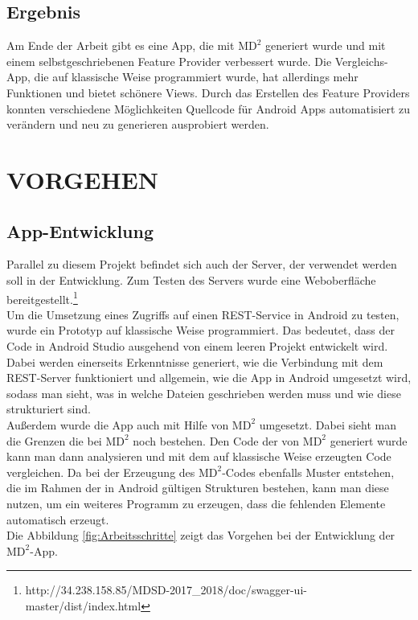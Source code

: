 \documentclass[a4paper,twoside]{article}
\begin{document}
	\subsection{Ergebnis}
	Am Ende der Arbeit gibt es eine App, die mit $\text{MD}^2$ generiert wurde und mit einem selbstgeschriebenen Feature Provider verbessert wurde. Die Vergleichs-App, die auf klassische Weise programmiert wurde, hat allerdings mehr Funktionen und bietet sch\"onere Views. Durch das Erstellen des Feature Providers konnten verschiedene M\"oglichkeiten Quellcode f\"ur Android Apps automatisiert zu ver\"andern und neu zu generieren ausprobiert werden.
	
	\section{\uppercase{Vorgehen}}
	
	\subsection{App-Entwicklung}
	
	\noindent Parallel zu diesem Projekt befindet sich auch der Server, der verwendet werden soll in der Entwicklung. Zum Testen des Servers wurde eine Web\-ober\-fl\"ache bereitgestellt.\footnote{http://34.238.158.85/MDSD-2017\_2018/doc/swagger-ui-master/dist/index.html} \\
	Um die Umsetzung eines Zugriffs auf einen REST-Service in Android zu testen, wurde ein Prototyp auf klassische Weise programmiert. Das bedeutet, dass der Code in Android Studio ausgehend von einem leeren Projekt entwickelt wird. Dabei werden einerseits Erkenntnisse generiert, wie die Verbindung mit dem REST-Server funktioniert und allgemein, wie die App in Android umgesetzt wird, sodass man sieht, was in welche Dateien geschrieben werden muss und wie diese strukturiert sind.\\
	Au\ss{}erdem wurde die App auch mit Hilfe von $\text{MD}^2$ umgesetzt. Dabei sieht man die Grenzen die bei $\text{MD}^2$ noch bestehen. Den Code der von $\text{MD}^2$ generiert wurde kann man dann analysieren und mit dem auf klassische Weise erzeugten Code vergleichen. Da bei der Erzeugung des $\text{MD}^2$-Codes ebenfalls Muster entstehen, die im Rahmen der in Android g\"ultigen Strukturen bestehen, kann man diese nutzen, um ein weiteres Programm zu erzeugen, dass die fehlenden Elemente automatisch erzeugt.\\
	Die Abbildung \ref{fig:Arbeitsschritte} zeigt das Vorgehen bei der Entwicklung der $\text{MD}^2$-App.
	
\end{document}
